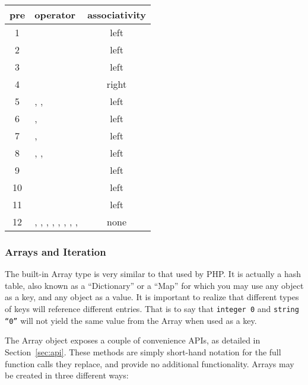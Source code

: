 \begin{tabular}{|c|l|c|}
  \hline
  pre & operator & associativity \\
  \hline
  1  & \oper{()} & left \\
  2  & \oper{[]} & left \\
  3  & \opex{!}  & left \\
  4  & \oper{**} & right \\
  5  & \oper{*}, \oper{/}, \oper{\%} & left \\
  6  & \oper{+}, \oper{-} & left \\
  7  & \oper{<<}, \oper{>>} & left \\
  8  & \oper{>=}, \oper{<=}\oper{<}, \oper{>} & left \\
  9  & \oper{==}  \opex{!=} & left \\
  10 & \oper{\&\&} & left \\
  11 & \oper{||} & left \\
  12 & \oper{=}, \oper{+=}, \oper{-=}, \oper{*=}, \oper{/=}, \oper{\%=}, \oper{**=}, \oper{<<=}, \oper{>>=} & none \\
  \hline
\end{tabular}


\subsubsection{Arrays and Iteration}

The built-in Array type is very similar to that used by PHP. It is actually
a hash table, also known as a ``Dictionary'' or a ``Map'' for which you may use
any object as a key, and any object as a value. It is important to realize that
different types of keys will reference different entries. That is to say that
{\tt integer 0} and {\tt string ``0''} will not yield the same value from the
Array when used as a key.

The Array object exposes a couple of convenience APIs, as detailed in Section~\ref{sec:api}.
These methods are simply short-hand notation for the full function calls they
replace, and provide no additional functionality. Arrays may be created in
three different ways:

